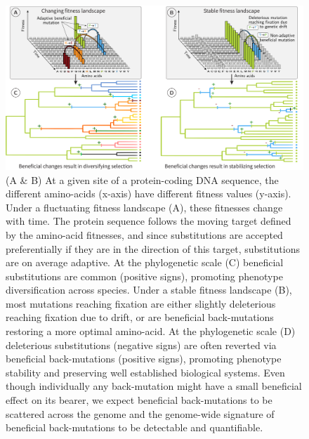 \documentclass{article}
\begin{document}
    \begin{figure}[!ht]
        \centering
        \includegraphics[width=\textwidth, page=1] {artworks/figure.fitness-landscape}
        \caption{
            (A \& B) At a given site of a protein-coding DNA sequence, the different amino-acids (x-axis) have different fitness values (y-axis).
            Under a fluctuating fitness landscape (A), these fitnesses change with time.
            The protein sequence follows the moving target defined by the amino-acid fitnesses, and since substitutions are accepted preferentially if they are in the direction of this target, substitutions are on average adaptive.
            At the phylogenetic scale (C) beneficial substitutions are common (positive signs), promoting phenotype diversification across species.
            Under a stable fitness landscape (B), most mutations reaching fixation are either slightly deleterious reaching fixation due to drift, or are beneficial back-mutations restoring a more optimal amino-acid.
            At the phylogenetic scale (D) deleterious substitutions (negative signs) are often reverted via beneficial back-mutations (positive signs), promoting phenotype stability and preserving well established biological systems.
            Even though individually any back-mutation might have a small beneficial effect on its bearer, we expect beneficial back-mutations to be scattered across the genome and the genome-wide signature of beneficial back-mutations to be detectable and quantifiable.}
        \label{fig:fitness-landscape}
    \end{figure}
\end{document}
